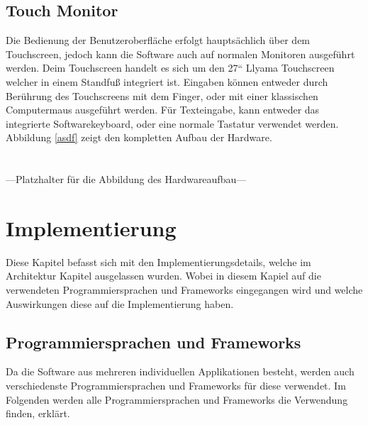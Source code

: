 \documentclass[12pt,a4paper,bibliography=totocnumbered,listof=totocnumbered]{article}
\begin{document}
\subsection{Touch Monitor}
Die Bedienung der Benutzeroberfläche erfolgt hauptsächlich über dem Touchscreen, jedoch kann die Software auch auf normalen Monitoren ausgeführt werden.
Deim Touchscreen handelt es sich um den 27“ Llyama Touchscreen welcher in einem Standfuß integriert ist. 
Eingaben können entweder durch Berührung des Touchscreens mit dem Finger, oder mit einer klassischen Computermaus ausgeführt werden.
Für Texteingabe, kann entweder das integrierte Softwarekeyboard, oder eine normale Tastatur verwendet werden.
Abbildung \ref{asdf} zeigt den kompletten Aufbau der Hardware.
\\\\\\
---Platzhalter für die Abbildung des Hardwareaufbau---

\pagebreak
\section{Implementierung}
Diese Kapitel befasst sich mit den Implementierungsdetails, welche im Architektur Kapitel ausgelassen wurden. Wobei in diesem 
Kapiel auf die verwendeten Programmiersprachen und Frameworks eingegangen wird und welche Auswirkungen diese auf 
die Implementierung haben.

\subsection{Programmiersprachen und Frameworks}
Da die Software aus mehreren individuellen Applikationen besteht, werden auch verschiedenste Programmiersprachen und Frameworks für diese verwendet.
Im Folgenden werden alle Programmiersprachen und Frameworks die Verwendung finden, erklärt.
\end{document}
